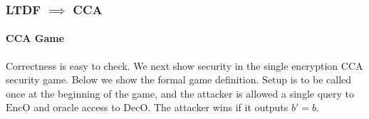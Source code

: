 \documentclass{beamer}
\begin{document}
\begin{frame}
    \frametitle{LTDF $\implies$ CCA}
    \framesubtitle{CCA Game}
    Correctness is easy to check. We next show security in the single
    encryption CCA security game. Below we show the formal game definition.
    $\mathrm{Setup}$ is to be called once at the beginning of the game, and
    the attacker is allowed a single query to $\mathrm{EncO}$ and oracle access to
    $\mathrm{DecO}$. The attacker wins if it outputs $b' = b$.
    \begin{center}
        \begin{pchstack}
        \end{pchstack}
    \end{center}

\end{frame}
\end{document}
